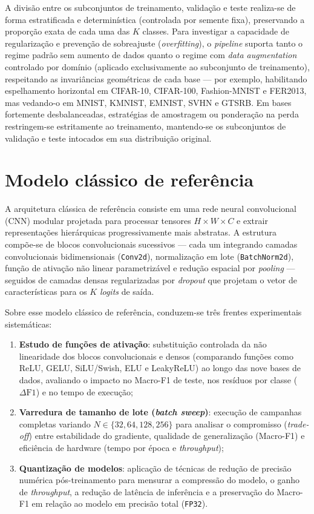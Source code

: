 \documentclass[
    12pt,
    openright,
    oneside,
    a4paper,
    english,
    brazil
]{abntex2}
\begin{document}
A divisão entre os subconjuntos de treinamento, validação e teste realiza-se de forma estratificada e determinística (controlada por semente fixa), preservando a proporção exata de cada uma das \(K\) classes. Para investigar a capacidade de regularização e prevenção de sobreajuste (\textit{overfitting}), o \textit{pipeline} suporta tanto o regime padrão sem aumento de dados quanto o regime com \textit{data augmentation} controlado por domínio (aplicado exclusivamente ao subconjunto de treinamento), respeitando as invariâncias geométricas de cada base --- por exemplo, habilitando espelhamento horizontal em CIFAR-10, CIFAR-100, Fashion-MNIST e FER2013, mas vedando-o em MNIST, KMNIST, EMNIST, SVHN e GTSRB. Em bases fortemente desbalanceadas, estratégias de amostragem ou ponderação na perda restringem-se estritamente ao treinamento, mantendo-se os subconjuntos de validação e teste intocados em sua distribuição original.

\section{Modelo clássico de referência}

A arquitetura clássica de referência consiste em uma rede neural convolucional (CNN) modular projetada para processar tensores \(H \times W \times C\) e extrair representações hierárquicas progressivamente mais abstratas. A estrutura compõe-se de blocos convolucionais sucessivos --- cada um integrando camadas convolucionais bidimensionais (\texttt{Conv2d}), normalização em lote (\texttt{BatchNorm2d}), função de ativação não linear parametrizável e redução espacial por \textit{pooling} --- seguidos de camadas densas regularizadas por \textit{dropout} que projetam o vetor de características para os \(K\) \textit{logits} de saída.

Sobre esse modelo clássico de referência, conduzem-se três frentes experimentais sistemáticas:
\begin{enumerate}
    \item \textbf{Estudo de funções de ativação}: substituição controlada da não linearidade dos blocos convolucionais e densos (comparando funções como ReLU, GELU, SiLU/Swish, ELU e LeakyReLU) ao longo das nove bases de dados, avaliando o impacto no Macro-F1 de teste, nos resíduos por classe (\(\Delta\text{F1}\)) e no tempo de execução;
    \item \textbf{Varredura de tamanho de lote (\textit{batch sweep})}: execução de campanhas completas variando \(N \in \{32, 64, 128, 256\}\) para analisar o compromisso (\textit{trade-off}) entre estabilidade do gradiente, qualidade de generalização (Macro-F1) e eficiência de hardware (tempo por época e \textit{throughput});
    \item \textbf{Quantização de modelos}: aplicação de técnicas de redução de precisão numérica pós-treinamento para mensurar a compressão do modelo, o ganho de \textit{throughput}, a redução de latência de inferência e a preservação do Macro-F1 em relação ao modelo em precisão total (\texttt{FP32}).
\end{enumerate}
\end{document}

